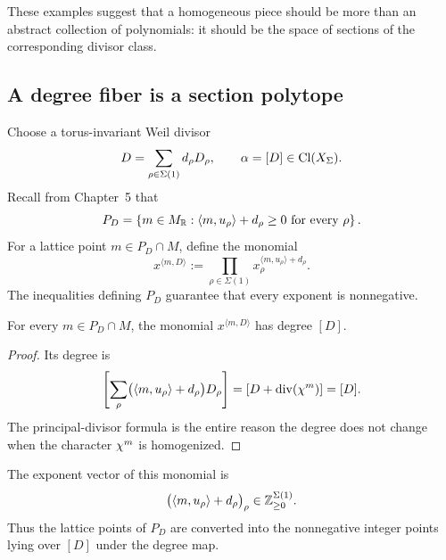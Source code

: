 These examples suggest that a homogeneous piece should be more than an
abstract collection of polynomials: it should be the space of sections
of the corresponding divisor class.

\subsection{A degree fiber is a section polytope}

Choose a torus-invariant Weil divisor
\[
D=\sum_{\rho\in\Sigma(1)}d_\rho D_\rho,
\qquad
\alpha=[D]\in\operatorname{Cl}(X_\Sigma).
\]
Recall from Chapter~5 that
\[
P_D
=
\left\{
 m\in M_{\mathbb{R}}:
 \langle m,u_\rho\rangle+d_\rho\geq0
 \text{ for every }\rho
\right\}.
\]
For a lattice point \(m\in P_D\cap M\), define the monomial
\[
x^{\langle m,D\rangle}
:=
\prod_{\rho\in\Sigma(1)}
 x_\rho^{\langle m,u_\rho\rangle+d_\rho}.
\]
The inequalities defining \(P_D\) guarantee that every exponent is
nonnegative.

\begin{lemma}
\label{lem:homogenizing-character}
For every \(m\in P_D\cap M\), the monomial
\(x^{\langle m,D\rangle}\) has degree \([D]\).
\end{lemma}

\begin{proof}
Its degree is
\[
\left[
\sum_\rho
\bigl(\langle m,u_\rho\rangle+d_\rho\bigr)D_\rho
\right]
=
\left[D+\operatorname{div}(\chi^{m})\right]
=[D].
\]
The principal-divisor formula is the entire reason the degree does not
change when the character \(\chi^{m}\) is homogenized.
\end{proof}

The exponent vector of this monomial is
\[
\bigl(\langle m,u_\rho\rangle+d_\rho\bigr)_\rho
\in\mathbb{Z}_{\geq0}^{\Sigma(1)}.
\]
Thus the lattice points of \(P_D\) are converted into the nonnegative
integer points lying over \([D]\) under the degree map.


